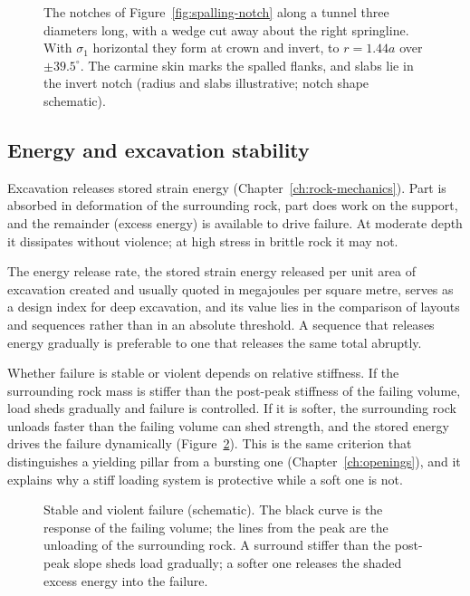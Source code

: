 \begin{figure}[htbp]
\centering
{}
\caption{The notches of Figure~\ref{fig:spalling-notch} along a tunnel three diameters long, with a wedge cut away about the right springline. With $\sigma_1$ horizontal they form at crown and invert, to $r = 1.44a$ over $\pm 39.5^\circ$. The carmine skin marks the spalled flanks, and slabs lie in the invert notch (radius and slabs illustrative; notch shape schematic).}
\label{fig:r3d-spalling-notch}
\end{figure}

\subsection{Energy and excavation stability}
\label{sec:energy-stability}

Excavation releases stored strain energy (Chapter~\ref{ch:rock-mechanics}). Part is absorbed in deformation of
the surrounding rock, part does work on the support, and the remainder
(excess energy) is available to drive failure. At moderate depth it
dissipates without violence; at high stress in brittle rock it may not.

The energy release rate, the stored strain energy released per unit area of
excavation created and usually quoted in megajoules per square metre, serves
as a design index for deep excavation, and its
value lies in the comparison of layouts and sequences rather than in an
absolute threshold. A sequence that releases energy gradually is preferable to
one that releases the same total abruptly.

Whether failure is stable or violent depends on relative stiffness. If the
surrounding rock mass is stiffer than the post-peak stiffness of the failing
volume, load sheds gradually and failure is controlled. If it is softer, the
surrounding rock unloads faster than the failing volume can shed strength, and
the stored energy drives the failure dynamically (Figure~\ref{fig:burst-stiffness}). This is the same criterion
that distinguishes a yielding pillar from a bursting one
(Chapter~\ref{ch:openings}), and it explains why a stiff loading system is
protective while a soft one is not.

\begin{figure}[htbp]
\centering
{}
\caption{Stable and violent failure (schematic). The black curve is the response of the failing volume; the lines from the peak are the unloading of the surrounding rock. A surround stiffer than the post-peak slope sheds load gradually; a softer one releases the shaded excess energy into the failure.}
\label{fig:burst-stiffness}
\end{figure}

